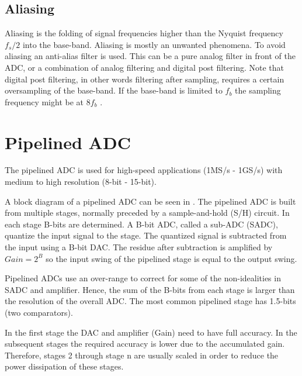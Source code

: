 \subsection{Aliasing}
Aliasing is the folding of signal frequencies higher
than the Nyquist frequency $f_s/2$ into the base-band. Aliasing is mostly an
unwanted phenomena. To avoid aliasing an anti-alias filter is
used. This can be a pure analog filter in front of the ADC, or a
combination of analog filtering and digital post filtering. Note that
digital post filtering, in other words filtering after sampling,
requires a certain oversampling of the base-band. If the base-band is
limited to $f_b$ the sampling frequency might be at $8f_b$
\cite{plassche}. 




\section{Pipelined ADC} \label{sc:adc_pipelined}
The pipelined ADC is used for high-speed applications (1MS/s -
1GS/s) with medium to high resolution (8-bit - 15-bit).

A block diagram of a pipelined ADC can be seen in 
. The pipelined ADC is built from multiple stages,
normally preceded by a sample-and-hold (S/H) circuit. In each stage
B-bits are determined. A B-bit ADC, called a sub-ADC (SADC), quantize
the input signal to the stage. The quantized signal is subtracted from
the input using a
B-bit DAC. The residue after subtraction is amplified  by $Gain=2^B$ so the input
swing of the pipelined stage is equal to the output swing. 

Pipelined ADCs use an over-range to correct for some of the
non-idealities in SADC and amplifier. Hence, the sum of the B-bits
 from each stage is larger than the resolution of the overall ADC. The
 most common pipelined stage has 1.5-bits (two comparators). 

In the first stage the DAC and amplifier (Gain) need to have
full accuracy. In the subsequent stages the required accuracy is lower
due to the accumulated gain. Therefore, stages 2 through stage n are
usually scaled in order to reduce the power dissipation of these
stages. 

